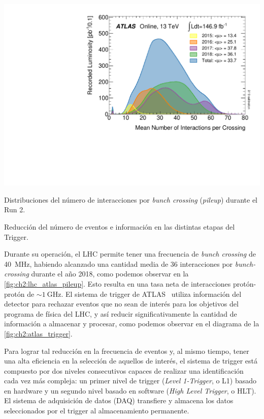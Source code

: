 \begin{marginfigure}[-50em]
    \includegraphics[width=0.99\marginparwidth]{Assets/Plots/mu_2015_2018.pdf}
    \caption{Distribuciones del número de interacciones por \textit{bunch crossing} (\textit{pileup}) durante el Run 2.}
    \label{fig:ch2:lhc_atlas_pileup}
\end{marginfigure}

\begin{marginfigure}[-15em]
    \centering
    
    \caption{Reducción del número de eventos e información en las distintas etapas del Trigger.}
    \label{fig:ch2:atlas_trigger}
\end{marginfigure}

Durante su operación, el LHC permite tener una frecuencia de \textit{bunch crossing} de \SI{40}{\mega\hertz}, habiendo alcanzado una cantidad media de 36 interacciones por \textit{bunch-crossing} durante el año 2018, como podemos observar en la \cref{fig:ch2:lhc_atlas_pileup}. Esto resulta en una tasa neta de interacciones protón-protón de $\sim\SI{1}{\giga\hertz}$. El sistema de trigger de ATLAS~\cite{Achenbach2008, Aaboud2017, TheATLASCollaboration2020} utiliza información del detector para rechazar eventos que no sean de interés para los objetivos del programa de física del LHC, y así reducir significativamente la cantidad de información a almacenar y procesar, como podemos observar en el diagrama de la \cref{fig:ch2:atlas_trigger}.

Para lograr tal reducción en la frecuencia de eventos y, al mismo tiempo, tener una alta eficiencia en la selección de aquellos de interés, el sistema de trigger está compuesto por dos niveles consecutivos capaces de realizar una identificación cada vez más compleja: un primer nivel de trigger (\textit{Level 1-Trigger}, o L1) basado en hardware y un segundo nivel basado en software (\textit{High Level Trigger}, o HLT). El sistema de adquisición de datos (DAQ) transfiere y almacena los datos seleccionados por el trigger al almacenamiento permanente.

